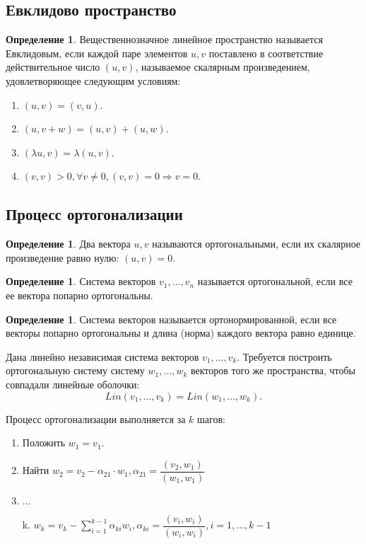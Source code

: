 \documentclass[12pt]{report}
\theoremstyle{definition}
\newtheorem{definition}[theorem]{Определение}
\begin{document}
\subsection{Евклидово пространство}
\begin{definition}
Вещественнозначное линейное пространство называется Евклидовым,
если каждой паре элементов $u, v$ поставлено в соответствие
действительное число $(u, v)$, называемое скалярным произведением,
удовлетворяющее следующим условиям:
\begin{enumerate}
\item $(u, v) = (v, u)$.
\item $(u, v + w) = (u, v) + (u, w)$.
\item $(\lambda u, v) = \lambda (u, v)$.
\item $(v, v) > 0, \forall v \ne 0, (v, v) = 0 \Rightarrow v = 0$.
\end{enumerate}
\end{definition}

\subsection{Процесс ортогонализации}
\begin{definition}
Два вектора $u, v$ называются ортогональными, если
их скалярное произведение равно нулю: $(u, v) = 0$.
\end{definition}

\begin{definition}
Система векторов $v_1, \dots, v_n$ называется ортогональной, если все ее
вектора попарно ортогональны.
\end{definition}

\begin{definition}
Система векторов называется ортонормированной, если 
все векторы попарно ортогональны и длина (норма) каждого вектора равно
единице.
\end{definition}

Дана линейно независимая система векторов $v_1, \dots, v_k$. Требуется
построить ортогональную систему систему $w_1, \dots, w_k$ векторов того же
пространства, чтобы совпадали линейные оболочки:
$$
Lin(v_1, \dots, v_k) = Lin(w_1, \dots, w_k).
$$

Процесс ортогонализации выполняется за $k$ шагов:
\begin{enumerate}
\item Положить $w_1 = v_1$.
\item Найти $w_2 = v_2 - \alpha_{21} \cdot w_1, \alpha_{21} = \dfrac{(v_2, w_1)}{(w_1, w_1)}$
\item $\dots$
\item[k.] $w_k = v_k - \sum\limits_{i = 1}^{k - 1} \alpha_{k i} w_i, 
\alpha_{ki} = \dfrac{(v_i, w_i)}{(w_i, w_i)}, i = 1, \dots, k - 1
$
\end{enumerate}
\end{document}
